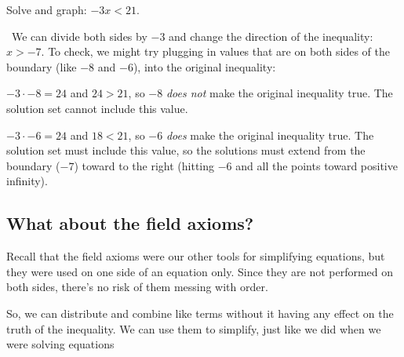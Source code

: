 \begin{boxex}
Solve and graph: $-3x < 21$.

\exsoln\ We can divide both sides by $-3$ and change the direction of the inequality: $x > -7$. To check, we might try plugging in values that are on both sides of the boundary (like $-8$ and $-6$), into the original inequality:

$-3 \cdot -8 = 24$ and $24 > 21$, so $-8$ \textit{does not} make the original inequality true. The solution set cannot include this value.

$-3 \cdot -6 = 24$ and $18 < 21$, so $-6$ \textit{does} make the original inequality true. The solution set must include this value, so the solutions must extend from the boundary ($-7$) toward to the right (hitting $-6$ and all the points toward positive infinity).

\begin{center}
\end{center}
\end{boxex}

\subsection{What about the field axioms?}

Recall that the field axioms were our other tools for simplifying equations, but they were used on one side of an equation only. Since they are not performed on both sides, there's no risk of them messing with order.

So, we can distribute and combine like terms without it having any effect on the truth of the inequality. We can use them to simplify, just like we did when we were solving equations

